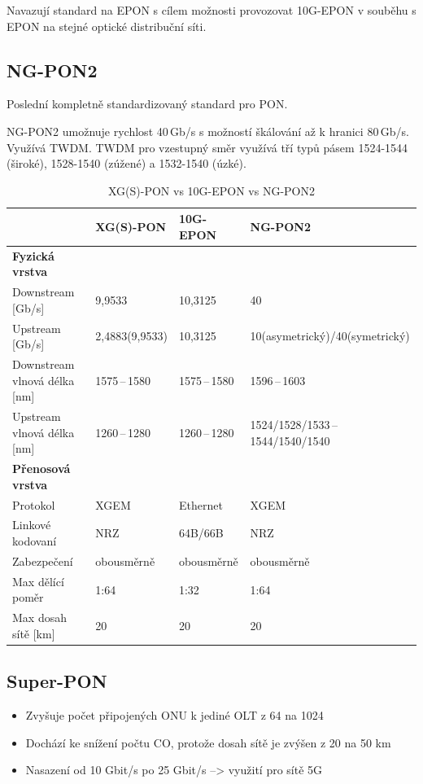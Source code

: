 Navazují standard na EPON s cílem možnosti provozovat 10G-EPON v souběhu s EPON na stejné optické distribuční síti.

\subsection{NG-PON2}
Poslední kompletně standardizovaný standard pro PON.

NG-PON2 umožnuje rychlost 40\,Gb/s s možností škálování až k hranici 80\,Gb/s. Využívá TWDM. TWDM pro vzestupný směr využívá tří typů pásem 1524-1544 (široké), 1528-1540 (zúžené) a 1532-1540 (úzké).

\begin{table}[ht]
    \centering
    \caption{XG(S)-PON vs 10G-EPON vs NG-PON2}
    \begin{tabular}{|l|l|l|l|}
        \hline
        & XG(S)-PON & 10G-EPON & NG-PON2 \\\hline\hline
        \textbf{Fyzická vrstva} & & & \\\hline\hline
        Downstream [Gb/s] & 9,9533 & 10,3125 & 40 \\\hline
        Upstream [Gb/s] & 2,4883(9,9533) & 10,3125 & 10(asymetrický)/40(symetrický) \\\hline
        Downstream vlnová délka [nm] & 1575\,--\,1580 & 1575\,--\,1580 & 1596\,--\,1603 \\\hline
        Upstream vlnová délka [nm] & 1260\,--\,1280 & 1260\,--\,1280 & 1524/1528/1533\,--\,1544/1540/1540 \\\hline\hline
        \textbf{Přenosová vrstva} & & & \\\hline\hline
        Protokol & XGEM & Ethernet & XGEM \\\hline
        Linkové kodovaní & NRZ & 64B/66B & NRZ \\\hline
        Zabezpečení & obousměrně & obousměrně & obousměrně \\\hline
        Max dělící poměr & 1:64 & 1:32 & 1:64\\\hline
        Max dosah sítě [km] & 20 & 20 & 20 \\\hline
    \end{tabular}
\end{table}

\subsection{Super-PON}
\begin{itemize}
    \item Zvyšuje počet připojených ONU k jediné OLT z 64 na 1024
    \item Dochází ke snížení počtu CO, protože dosah sítě je zvýšen z 20 na 50 km
    \item Nasazení od 10 Gbit/s po 25 Gbit/s –> využití pro sítě 5G
\end{itemize}

